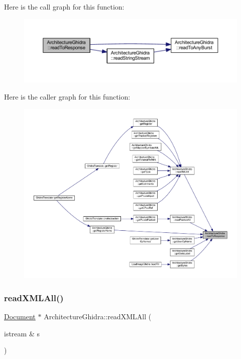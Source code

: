 Here is the call graph for this function\+:
\nopagebreak
\begin{figure}[H]
\begin{center}
\leavevmode
\includegraphics[width=350pt]{class_architecture_ghidra_a3b18a5a9e669ac8adabe9da47d2aaddf_cgraph}
\end{center}
\end{figure}
Here is the caller graph for this function\+:
\nopagebreak
\begin{figure}[H]
\begin{center}
\leavevmode
\includegraphics[width=350pt]{class_architecture_ghidra_a3b18a5a9e669ac8adabe9da47d2aaddf_icgraph}
\end{center}
\end{figure}
\mbox{\label{class_architecture_ghidra_ae71b65457955432775931afde0d1c933}} 
\subsubsection{\texorpdfstring{readXMLAll()}{readXMLAll()}}
{\footnotesize\ttfamily \mbox{\hyperlink{class_document}{Document}} $\ast$ Architecture\+Ghidra\+::read\+X\+M\+L\+All (\begin{DoxyParamCaption}\item[{istream \&}]{s }\end{DoxyParamCaption})\hspace{0.3cm}{\ttfamily [static]}}



